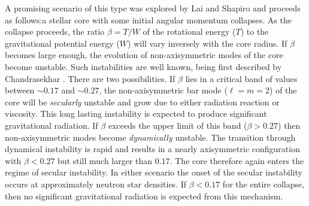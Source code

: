A promising scenario of this type was explored by Lai and Shapiro \cite{LS95}
and proceeds as follows:a
stellar core with some initial angular momentum collapses. As the collapse
proceeds, the ratio $\beta=T/W$ of the rotational energy ($T$) to the
gravitational potential energy ($W$) will vary inversely with the core 
radius. If $\beta$ becomes large enough, the evolution of non-axisymmetric 
modes of the core become unstable. Such instabilities are well known, being 
first described by Chandrasekhar \cite{Chandra69}. There are two 
possibilities. If $\beta$ lies in a critical band of values between 
$\sim 0.17$ and $\sim 0.27$, the non-axisymmetric bar mode ($\ell=m=2$) of the 
core will be {\em secularly} unstable and grow due to either radiation 
reaction or viscosity. This long lasting instability is expected to produce 
significant gravitational radiation. If $\beta$ exceeds the upper limit of 
this band ($\beta > 0.27$) then non-axisymmetric modes become {\em dynamically} 
unstable. The transition through dynamical instability is rapid and results in 
a nearly axisymmetric configuration with $\beta < 0.27$ but still much 
larger than $0.17$. The core therefore again enters the regime of secular 
instability. In either scenario the onset of the secular instability occurs 
at approximately neutron star densities. If $\beta < 0.17$ for the entire 
collapse, then no significant gravitational radiation is expected from this
mechanism.

